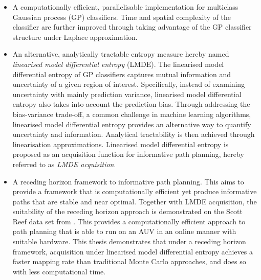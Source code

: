		\begin{itemize}
		
			\item A computationally efficient, parallelisable implementation for multiclass Gaussian process (GP) classifiers. Time and spatial complexity of the classifier are further improved through taking advantage of the GP classifier structure under Laplace approximation.
			
			
			\item An alternative, analytically tractable entropy measure hereby named \textit{linearised model differential entropy} (LMDE). The linearised model differential entropy of GP classifiers captures mutual information and uncertainty of a given region of interest. Specifically, instead of examining uncertainty with mainly prediction variance, linearised model differential entropy also takes into account the prediction bias. Through addressing the bias-variance trade-off, a common challenge in machine learning algorithms, linearised model differential entropy provides an alternative way to quantify uncertainty and information. Analytical tractability is then achieved through linearisation approximations. Linearised model differential entropy is proposed as an acquisition function for informative path planning, hereby referred to as \textit{LMDE acquisition}.
			
			\item A receding horizon framework to informative path planning. This aims to provide a framework that is computationally efficient yet produce informative paths that are stable and near optimal. Together with LMDE acquisition, the suitability of the receding horizon approach is demonstrated on the Scott Reef data set from \cite{IMOS}. This provides a computationally efficient approach to path planning that is able to run on an AUV in an online manner with suitable hardware. This thesis demonstrates that under a receding horizon framework, acquisition under linearised model differential entropy achieves a faster mapping rate than traditional Monte Carlo approaches, and does so with less computational time. 
			
		\end{itemize}
		
